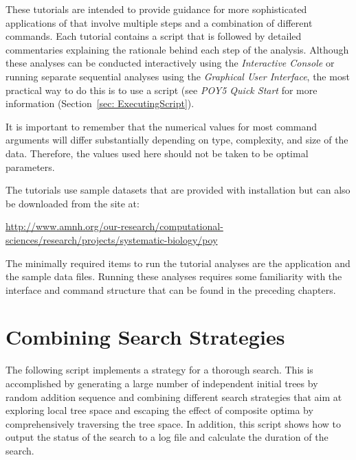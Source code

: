 These tutorials are intended to provide guidance for more sophisticated applications of \poy that involve 
multiple steps and a combination of different commands. Each tutorial contains a \poy script that is followed 
by detailed commentaries explaining the rationale behind each step of the analysis. Although these analyses 
can be conducted interactively using the \emph{Interactive Console} or running separate sequential analyses
 using the \emph{Graphical User Interface}, the most practical way to do this is to use a \poy script (see 
 \emph{POY5 Quick Start} for more information (Section~\ref{sec: ExecutingScript}).\\


\begin{statement}
It is important to remember that the numerical values for most command arguments will differ substantially 
depending on type, complexity, and size of the data. Therefore, the values used here should not be taken to be 
optimal parameters.
\end{statement}

\indent The tutorials use sample datasets that are provided with \poy installation but can also be downloaded from 
the \poy site at:
\begin{center}
\url{http://www.amnh.org/our-research/computational-sciences/research/projects/systematic-biology/poy}
\end{center}
The minimally required items to run the tutorial analyses are the \poy application and the sample data files. 
Running these analyses requires some familiarity with the \poy interface and command structure that can be 
found in the preceding chapters.


\section{Combining Search Strategies}{\label{tutorial1}}

The following script implements a strategy for a thorough search. This is accomplished by generating a large 
number of independent initial trees by random addition sequence and combining different search strategies 
that aim at exploring local tree space and escaping the effect of composite optima by comprehensively 
traversing the tree space. In addition, this script shows how to output the status of the search to a log file and
 calculate the duration of the search. 

